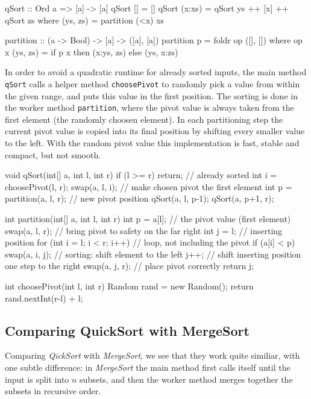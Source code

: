 \begin{haskellcode}
qSort :: Ord a => [a] -> [a]
qSort [] = []
qSort (x:xs) = qSort ys ++ [x] ++ qSort zs
    where (ys, zs) = partition (<x) xs

partition :: (a -> Bool) -> [a] -> ([a], [a])
partition p = foldr op ([], [])
    where op x (ys, zs) = if p x then (x:ys, zs) else (ys, x:zs)
\end{haskellcode}

\begin{impl}
In order to avoid a quadratic runtime for already sorted inputs, the main method \texttt{qSort} calls a helper method \texttt{choosePivot} to randomly pick a value from within the given range, and puts this value in the first position.
The sorting is done in the worker method \texttt{partition}, where the pivot value is always taken from the first element (the randomly choosen element).
In each partitioning step the current pivot value is copied into its final position by shifting every smaller value to the left. With the random pivot value this implementation is fast, stable and compact, but not smooth.
\end{impl}

\begin{javacode}
void qSort(int[] a, int l, int r) {
    if (l >= r) return; // already sorted
    int i = choosePivot(l, r);
    swap(a, l, i); // make chosen pivot the first element
    int p = partition(a, l, r); // new pivot position
    qSort(a, l, p-1);
    qSort(a, p+1, r);
}

int partition(int[] a, int l, int r) {
    int p = a[l]; // the pivot value (first element)
    swap(a, l, r); // bring pivot to safety on the far right
    int j = l; // inserting position
    for (int i = l; i < r; i++) { // loop, not including the pivot
        if (a[i] < p) {
            swap(a, i, j); // sorting: shift element to the left
            j++; // shift inserting position one step to the right
        }
    }
    swap(a, j, r); // place pivot correctly
    return j;
}

int choosePivot(int l, int r) {
    Random rand = new Random();
    return rand.nextInt(r-l) + l;
}
\end{javacode}

\subsection{Comparing QuickSort with MergeSort}

Comparing \emph{QickSort} with \emph{MergeSort}, we see that they work quite similiar, with one subtle difference:
in \emph{MergeSort} the main method first calls itself until the input is split into $n$ subsets, and then the worker method merges together the subsets in recursive order.

